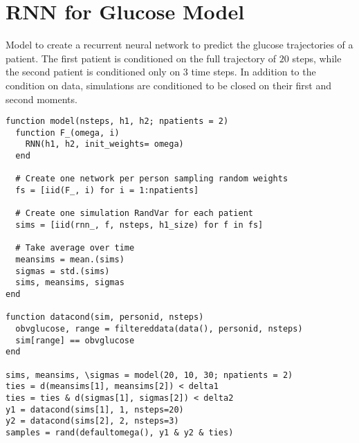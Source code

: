\appendix
\section{RNN for Glucose Model}
\label{app:glucose-code}
Model to create a recurrent neural network to predict the glucose trajectories of a patient. The first patient is conditioned on the full trajectory of $20$ steps, while the second patient is conditioned only on $3$ time steps. In addition to the condition on data, simulations are conditioned to be closed on their first and second moments. 
\begin{minipage}{5cm}
\begin{Verbatim}[fontsize=\small]
function model(nsteps, h1, h2; npatients = 2)
  function F_(omega, i)
  	RNN(h1, h2, init_weights= omega)
  end

  # Create one network per person sampling random weights 
  fs = [iid(F_, i) for i = 1:npatients]

  # Create one simulation RandVar for each patient
  sims = [iid(rnn_, f, nsteps, h1_size) for f in fs]

  # Take average over time
  meansims = mean.(sims)
  sigmas = std.(sims)
  sims, meansims, sigmas
end

function datacond(sim, personid, nsteps)
  obvglucose, range = filtereddata(data(), personid, nsteps)
  sim[range] == obvglucose
end

sims, meansims, \sigmas = model(20, 10, 30; npatients = 2)
ties = d(meansims[1], meansims[2]) < delta1
ties = ties & d(sigmas[1], sigmas[2]) < delta2
y1 = datacond(sims[1], 1, nsteps=20)
y2 = datacond(sims[2], 2, nsteps=3)
samples = rand(defaultomega(), y1 & y2 & ties)
\end{Verbatim}
\end{minipage}
